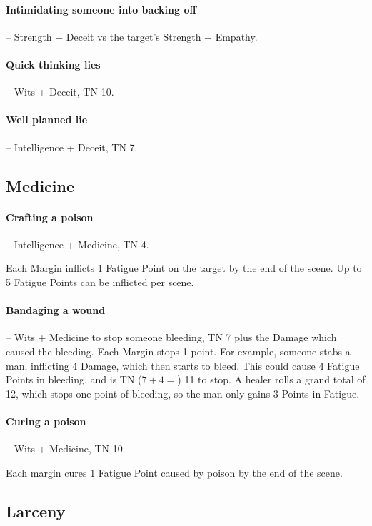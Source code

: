 \begin{multicols}{2}
\paragraph{Intimidating someone into backing off} -- Strength + Deceit vs the target's Strength + Empathy.

\paragraph{Quick thinking lies} -- Wits + Deceit, TN 10.

\paragraph{Well planned lie} -- Intelligence + Deceit, TN 7.

\subsection{Medicine}

\paragraph{Crafting a poison} -- Intelligence + Medicine, TN 4.

Each Margin inflicts 1 Fatigue Point on the target by the end of the scene.
Up to 5 Fatigue Points can be inflicted per scene.

\paragraph{Bandaging a wound} -- Wits + Medicine to stop someone bleeding, TN 7 plus the Damage which caused the bleeding.
Each Margin stops 1 point.
For example, someone stabs a man, inflicting 4 Damage, which then starts to bleed.
This could cause 4 Fatigue Points in bleeding, and is TN ($7 + 4 = $) 11 to stop.
A healer rolls a grand total of 12, which stops one point of bleeding, so the man only gains 3 Points in Fatigue.

\paragraph{Curing a poison} -- Wits + Medicine, TN 10.

Each margin cures 1 Fatigue Point caused by poison by the end of the scene.

\subsection{Larceny}


\end{multicols}
